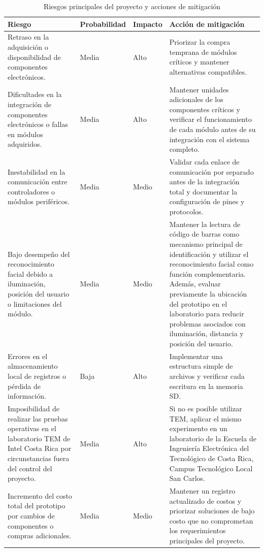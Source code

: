\begin{table}[H]
\centering
\caption{Riesgos principales del proyecto y acciones de mitigación}
\label{tab:riesgos_proyecto}
\scriptsize
\renewcommand{\arraystretch}{1.25}
\begin{tabular}{p{} p{} p{} p{}}
\toprule
\textbf{Riesgo} & \textbf{Probabilidad} & \textbf{Impacto} & \textbf{Acción de mitigación} \\
\midrule

Retraso en la adquisición o disponibilidad de componentes electrónicos.
& Media
& Alto
& Priorizar la compra temprana de módulos críticos y mantener alternativas
compatibles. \\

Dificultades en la integración de componentes electrónicos o fallas en módulos adquiridos.
& Media
& Alto
& Mantener unidades adicionales de los componentes críticos y verificar el funcionamiento de cada módulo antes de su integración con el sistema completo. \\

Inestabilidad en la comunicación entre controladores o módulos periféricos.
& Media
& Medio
& Validar cada enlace de comunicación por separado antes de la integración total
y documentar la configuración de pines y protocolos. \\

Bajo desempeño del reconocimiento facial debido a iluminación, posición del
usuario o limitaciones del módulo.
& Media
& Medio
& Mantener la lectura de código de barras como mecanismo principal de
identificación y utilizar el reconocimiento facial como función complementaria.
Además, evaluar previamente la ubicación del prototipo en el laboratorio
para reducir problemas asociados con iluminación, distancia y posición del
usuario. \\

Errores en el almacenamiento local de registros o pérdida de información.
& Baja
& Alto
& Implementar una estructura simple de archivos y verificar cada escritura en la
memoria SD. \\

Imposibilidad de realizar las pruebas operativas en el laboratorio TEM de Intel
Costa Rica por circunstancias fuera del control del proyecto.
& Media
& Alto
& Si no es
posible utilizar TEM, aplicar el mismo experimento en un laboratorio de la
Escuela de Ingeniería Electrónica del Tecnológico de Costa Rica, Campus
Tecnológico Local San Carlos. \\

Incremento del costo total del prototipo por cambios de componentes o compras
adicionales.
& Media
& Medio
& Mantener un registro actualizado de costos y priorizar soluciones de bajo costo
que no comprometan los requerimientos principales del proyecto. \\

\bottomrule
\end{tabular}
\end{table}

